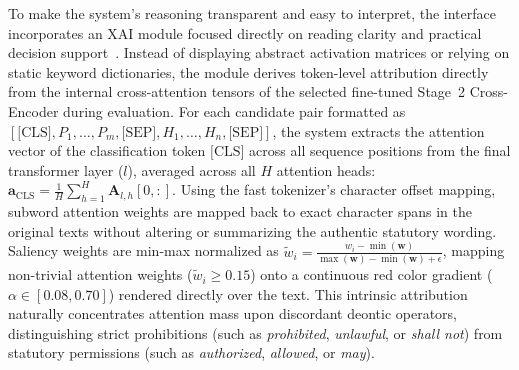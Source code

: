     To make the system's reasoning transparent and easy to interpret, the interface incorporates an XAI module focused directly on reading clarity and practical decision support~\cite{doshi2017towards, rudin2019stop}. Instead of displaying abstract activation matrices or relying on static keyword dictionaries, the module derives token-level attribution directly from the internal cross-attention tensors of the selected fine-tuned Stage~2 Cross-Encoder during evaluation. For each candidate pair formatted as $[\text{[CLS]}, P_1, \dots, P_m, \text{[SEP]}, H_1, \dots, H_n, \text{[SEP]}]$, the system extracts the attention vector of the classification token $\text{[CLS]}$ across all sequence positions from the final transformer layer ($l$), averaged across all $H$ attention heads: $\mathbf{a}_{\text{CLS}} = \frac{1}{H} \sum_{h=1}^{H} \mathbf{A}_{l, h}[0, :]$. Using the fast tokenizer's character offset mapping, subword attention weights are mapped back to exact character spans in the original texts without altering or summarizing the authentic statutory wording. Saliency weights are min-max normalized as $\tilde{w}_i = \frac{w_i - \min(\mathbf{w})}{\max(\mathbf{w}) - \min(\mathbf{w}) + \epsilon}$, mapping non-trivial attention weights ($\tilde{w}_i \ge 0.15$) onto a continuous red color gradient ($\alpha \in [0.08, 0.70]$) rendered directly over the text. This intrinsic attribution naturally concentrates attention mass upon discordant deontic operators, distinguishing strict prohibitions (such as \textit{prohibited}, \textit{unlawful}, or \textit{shall not}) from statutory permissions (such as \textit{authorized}, \textit{allowed}, or \textit{may}).

